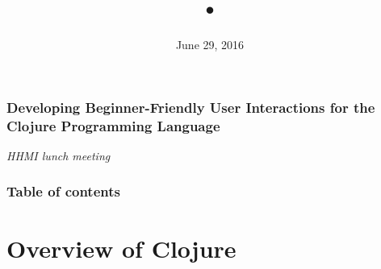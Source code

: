 \documentclass{beamer}
\begin{document}
\title{•}
\date{June 29, 2016}

\begin{frame}
\frametitle{Developing Beginner-Friendly User Interactions for the Clojure Programming Language}
{\centering
\noindent

{\it 
HHMI lunch meeting\par}
}
\end{frame}

\begin{frame}
\frametitle{Table of contents}
\tableofcontents  
\end{frame}

\section{Overview of Clojure}
\end{document}
